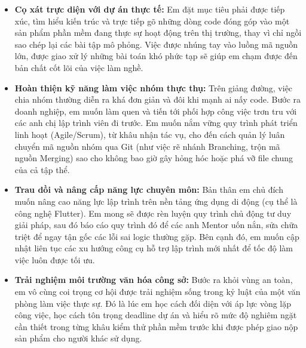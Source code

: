 \documentclass[12pt, a4paper]{article}
\begin{document}
\begin{itemize}
    \item \textbf{Cọ xát trực diện với dự án thực tế:} 
    Em đặt mục tiêu phải được tiếp xúc, tìm hiểu kiến trúc và trực tiếp gõ những dòng code đóng góp vào một sản phẩm phần mềm đang thực sự hoạt động trên thị trường, thay vì chỉ ngồi sao chép lại các bài tập mô phỏng. Việc được nhúng tay vào luồng mã nguồn lớn, được giao xử lý những bài toán khó phức tạp sẽ giúp em chạm được đến bản chất cốt lõi của việc làm nghề.

    \item \textbf{Hoàn thiện kỹ năng làm việc nhóm thực thụ:} 
    Trên giảng đường, việc chia nhóm thường diễn ra khá đơn giản và đôi khi mạnh ai nấy code. Bước ra doanh nghiệp, em muốn làm quen và tiến tới phối hợp công việc trơn tru với các anh chị lập trình viên đi trước. Em muốn nắm vững quy trình phát triển linh hoạt (Agile/Scrum), từ khâu nhận tác vụ, cho đến cách quản lý luân chuyển mã nguồn nhóm qua Git (như việc rẽ nhánh Branching, trộn mã nguồn Merging) sao cho không bao giờ gây hỏng hóc hoặc phá vỡ file chung của cả tập thể.

    \item \textbf{Trau dồi và nâng cấp năng lực chuyên môn:} 
    Bản thân em chủ đích muốn nâng cao năng lực lập trình trên nền tảng ứng dụng di động (cụ thể là công nghệ Flutter). Em mong sẽ được rèn luyện quy trình chủ động tư duy giải pháp, sau đó báo cáo quy trình đó để các anh Mentor uốn nắn, sửa chữa triệt để ngay tận gốc các lỗi sai logic thường gặp. Bên cạnh đó, em muốn cập nhật liên tục các xu hướng công cụ hỗ trợ lập trình mới nhất để tốc độ làm việc luôn được tối ưu.

    \item \textbf{Trải nghiệm môi trường văn hóa công sở:} 
    Bước ra khỏi vùng an toàn, em vô cùng coi trọng cơ hội được trải nghiệm sống trong kỷ luật của một văn phòng làm việc thực sự. Đó là lúc em học cách đối diện với áp lực vòng lặp công việc, học cách tôn trọng deadline dự án và hiểu rõ mức độ nghiêm ngặt cần thiết trong từng khâu kiểm thử phần mềm trước khi được phép giao nộp sản phẩm cho người khác sử dụng.
\end{itemize}
\end{document}
